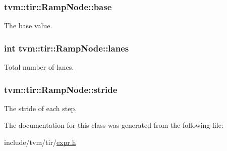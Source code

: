 \subsubsection[{\texorpdfstring{base}{base}}]{ tvm\+::tir\+::\+Ramp\+Node\+::base}\hypertarget{classtvm_1_1tir_1_1RampNode_aed87b929f940da5ded10afaa7a3a810c}{}\label{classtvm_1_1tir_1_1RampNode_aed87b929f940da5ded10afaa7a3a810c}


The base value. 

\subsubsection[{\texorpdfstring{lanes}{lanes}}]{\setlength{\rightskip}{0pt plus 5cm}int tvm\+::tir\+::\+Ramp\+Node\+::lanes}\hypertarget{classtvm_1_1tir_1_1RampNode_a3fcfb520220b2fe522f9734f067ed979}{}\label{classtvm_1_1tir_1_1RampNode_a3fcfb520220b2fe522f9734f067ed979}


Total number of lanes. 

\subsubsection[{\texorpdfstring{stride}{stride}}]{ tvm\+::tir\+::\+Ramp\+Node\+::stride}\hypertarget{classtvm_1_1tir_1_1RampNode_a618c78e39d18f999dbdd3fe01436f447}{}\label{classtvm_1_1tir_1_1RampNode_a618c78e39d18f999dbdd3fe01436f447}


The stride of each step. 



The documentation for this class was generated from the following file\+:\begin{DoxyCompactItemize}
\item 
include/tvm/tir/\hyperlink{tir_2expr_8h}{expr.\+h}\end{DoxyCompactItemize}
